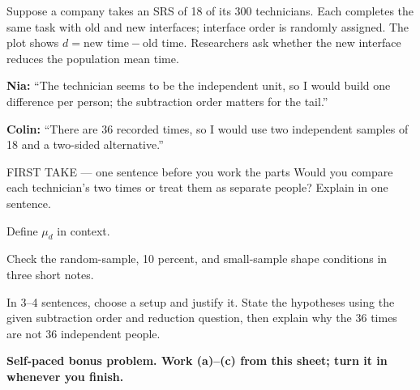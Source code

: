 \documentclass[14pt]{extarticle}
\begin{document}
\pagestyle{empty}


\noindent\begin{minipage}[t]{0.57\linewidth}
\vspace{0pt}
Suppose a company takes an SRS of 18 of its 300 technicians. Each completes the same task with old and new interfaces; interface order is randomly assigned. The plot shows $d=\text{new time}-\text{old time}$. Researchers ask whether the new interface reduces the population mean time.\par\smallskip \textbf{Nia:} ``The technician seems to be the independent unit, so I would build one difference per person; the subtraction order matters for the tail.''\par \textbf{Colin:} ``There are 36 recorded times, so I would use two independent samples of 18 and a two-sided alternative.''\par
\end{minipage}\hfill
\begin{minipage}[t]{0.40\linewidth}
\vspace{0pt}
\begin{center}
\end{center}
\end{minipage}

\begin{firsttakebox}{FIRST TAKE --- one sentence before you work the parts}
Would you compare each technician's two times or treat them as separate people? Explain in one sentence.
\end{firsttakebox}

\begin{description}[leftmargin=1.15in, labelwidth=1in, itemsep=2pt, topsep=2pt]
  \item[\dokbadge{1}~(a)] Define $\mu_d$ in context.
  \item[\dokbadge{2}~(b)] Check the random-sample, 10 percent, and small-sample shape conditions in three short notes.
  \item[\dokbadge{3}~(c)] In 3--4 sentences, choose a setup and justify it. State the hypotheses using the given subtraction order and reduction question, then explain why the 36 times are not 36 independent people.
\end{description}

\vfill
\textbf{Self-paced bonus problem. Work (a)--(c) from this sheet; turn it in whenever you finish.}
\end{document}
